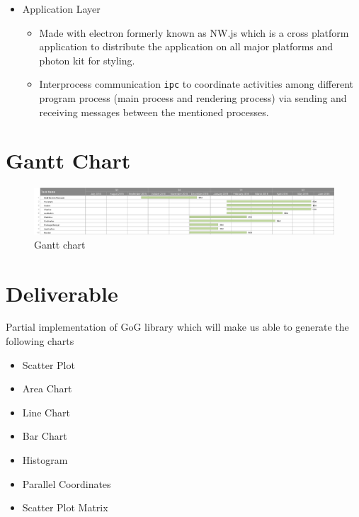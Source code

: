 \documentclass[12pt]{article}
\begin{document}
\begin{itemize}
\begin{itemize}
\begin{itemize}
\item Usage
\begin{itemize}
\item Add Or Update a plugin.
\begin{equation*}
vispack \hspace{3} install \hspace{3} plugin\_name \nonumber
\end{equation*}
\item Remove a plugin
\begin{equation*}
vispack \hspace{3} remove \hspace{3} plugin\_name \nonumber
\end{equation*}
\end{itemize}

\end{itemize}
\item {\Large Application Layer}
\begin{itemize}
\item Made with electron formerly known as NW.js which is a cross platform application to distribute the application on all major platforms and photon kit for styling.
\item Interprocess communication \texttt{ipc} to coordinate activities among different program process (main process and rendering process) via sending and  receiving messages between the mentioned processes.
\end{itemize}
\end{itemize}


\section{Gantt Chart}
\begin{figure}[h!]
\caption{Gantt chart}
\includegraphics[width=\textwidth]{gantt}

\end{figure}

\pagebreak

\section{Deliverable}
Partial implementation of GoG library which will make us able to generate the following charts
\begin{itemize}
\item Scatter Plot
\item Area Chart
\item Line Chart
\item Bar Chart
\item Histogram
\item Parallel Coordinates
\item Scatter Plot Matrix 
\end{itemize}



\end{itemize}
\end{document}
